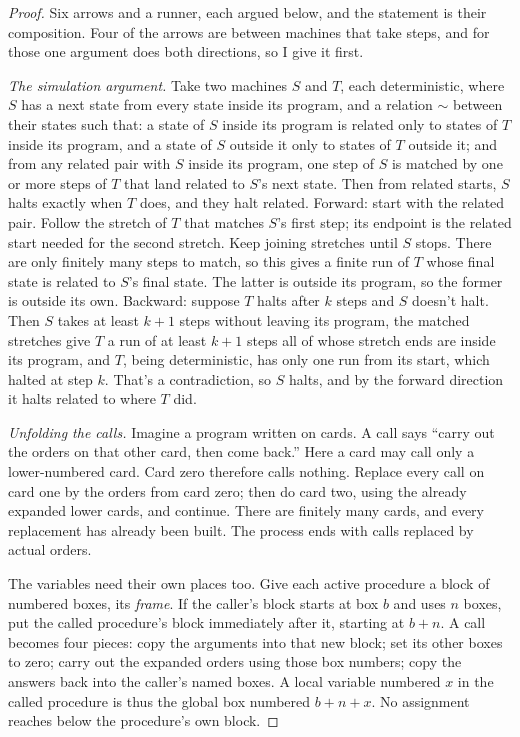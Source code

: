 \documentclass[11pt,twoside]{article}
\theoremstyle{thielethm}
\theoremstyle{thieledef}
\theoremstyle{thieledef}
\theoremstyle{thieledef}
\theoremstyle{thielethm}
\theoremstyle{thieleobs}
\theoremstyle{thielethm}
\begin{document}
\begin{proof}
Six arrows and a runner, each argued below, and the statement is their composition. Four of the
arrows are between machines that take steps, and for those one argument does both directions, so
I give it first.

\emph{The simulation argument.} Take two machines $S$ and $T$, each deterministic, where $S$ has a
next state from every state inside its program, and a relation $\sim$ between their states such
that: a state of $S$ inside its program is related only to states of $T$ inside its program, and
a state of $S$ outside it only to states of $T$ outside it; and from any related pair with $S$
inside its program, one step of $S$ is matched by one or more steps of $T$ that land related to
$S$'s next state. Then from related starts, $S$ halts exactly when $T$ does, and they halt
related. Forward: start with the related pair. Follow the stretch of $T$ that
matches $S$'s first step; its endpoint is the related start needed for the
second stretch. Keep joining stretches until $S$ stops. There are only
finitely many steps to match, so this gives a finite run of $T$ whose final
state is related to $S$'s final state. The latter is outside its program,
so the former is outside its own. Backward: suppose $T$ halts after $k$ steps and $S$ doesn't halt. Then $S$ takes at least
$k + 1$ steps without leaving its program, the matched stretches give $T$ a run of at least
$k + 1$ steps all of whose stretch ends are inside its program, and $T$, being deterministic, has
only one run from its start, which halted at step $k$. That's a contradiction, so $S$ halts, and
by the forward direction it halts related to where $T$ did.

\emph{Unfolding the calls.} Imagine a program written on cards. A call says
``carry out the orders on that other card, then come back.'' Here a card may
call only a lower-numbered card. Card zero therefore calls nothing. Replace
every call on card one by the orders from card zero; then do card two, using
the already expanded lower cards, and continue. There are finitely many cards,
and every replacement has already been built. The process ends with calls
replaced by actual orders.

The variables need their own places too. Give each active procedure a block
of numbered boxes, its \emph{frame}. If the caller's block starts at box $b$
and uses $n$ boxes, put the called procedure's block immediately after it,
starting at $b+n$. A call becomes four pieces: copy the arguments into that
new block; set its other boxes to zero; carry out the expanded orders using
those box numbers; copy the answers back into the caller's named boxes.
A local variable numbered $x$ in the called procedure is thus the global
box numbered $b+n+x$. No assignment reaches below the procedure's own block.


\end{proof}
\end{document}
